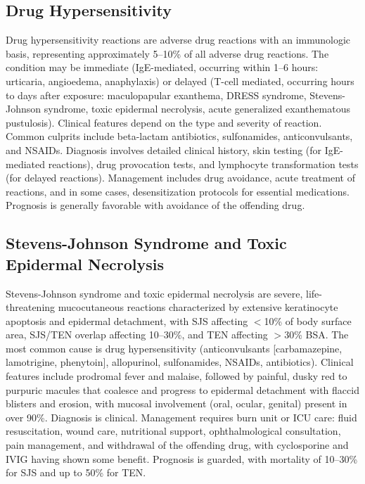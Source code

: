 \subsection{Drug Hypersensitivity}
\label{sec:Drug Hypersensitivity}
Drug hypersensitivity reactions are adverse drug reactions with an immunologic basis, representing approximately 5--10\% of all adverse drug reactions. The condition may be immediate (IgE-mediated, occurring within 1--6 hours: urticaria, angioedema, anaphylaxis) or delayed (T-cell mediated, occurring hours to days after exposure: maculopapular exanthema, DRESS syndrome, Stevens-Johnson syndrome, toxic epidermal necrolysis, acute generalized exanthematous pustulosis). Clinical features depend on the type and severity of reaction. Common culprits include beta-lactam antibiotics, sulfonamides, anticonvulsants, and NSAIDs. Diagnosis involves detailed clinical history, skin testing (for IgE-mediated reactions), drug provocation tests, and lymphocyte transformation tests (for delayed reactions). Management includes drug avoidance, acute treatment of reactions, and in some cases, desensitization protocols for essential medications. Prognosis is generally favorable with avoidance of the offending drug.

\subsection{Stevens-Johnson Syndrome and Toxic Epidermal Necrolysis}
\label{sec:Stevens-Johnson Syndrome and Toxic Epidermal Necrolysis}
Stevens-Johnson syndrome and toxic epidermal necrolysis are severe, life-threatening mucocutaneous reactions characterized by extensive keratinocyte apoptosis and epidermal detachment, with SJS affecting $<$10\% of body surface area, SJS/TEN overlap affecting 10--30\%, and TEN affecting $>$30\% BSA. The most common cause is drug hypersensitivity (anticonvulsants [carbamazepine, lamotrigine, phenytoin], allopurinol, sulfonamides, NSAIDs, antibiotics). Clinical features include prodromal fever and malaise, followed by painful, dusky red to purpuric macules that coalesce and progress to epidermal detachment with flaccid blisters and erosion, with mucosal involvement (oral, ocular, genital) present in over 90\%. Diagnosis is clinical. Management requires burn unit or ICU care: fluid resuscitation, wound care, nutritional support, ophthalmological consultation, pain management, and withdrawal of the offending drug, with cyclosporine and IVIG having shown some benefit. Prognosis is guarded, with mortality of 10--30\% for SJS and up to 50\% for TEN.

